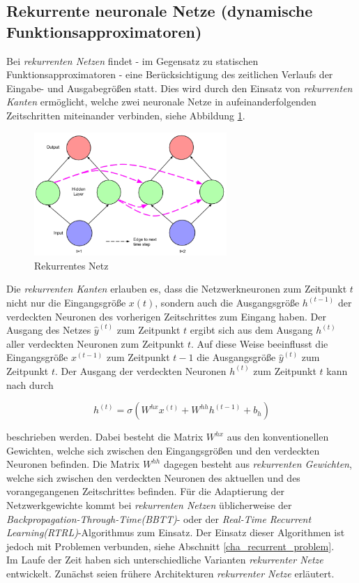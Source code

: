 \subsection{Rekurrente neuronale Netze (dynamische Funktionsapproximatoren)}

Bei \textit{rekurrenten Netzen} findet - im Gegensatz zu statischen Funktionsapproximatoren - eine Berücksichtigung des zeitlichen Verlaufs der Eingabe- und Ausgabegrößen statt. Dies wird durch den Einsatz von \textit{rekurrenten Kanten} ermöglicht, welche zwei neuronale Netze in aufeinanderfolgenden Zeitschritten miteinander verbinden, siehe Abbildung \ref{fig:recurrent}.  

\begin{figure} [h]
	\centering
	\includegraphics[width=0.65\textwidth]{images/recurrent_net}
	\caption{Rekurrentes Netz \cite{Lipton.5292015}}
	\label{fig:recurrent}
\end{figure}

Die \textit{rekurrenten Kanten} erlauben es, dass die Netzwerkneuronen zum Zeitpunkt $t$ nicht nur die Eingangsgröße $x(t)$, sondern auch die Ausgangsgröße $h^{(t-1)}$ der verdeckten Neuronen des vorherigen Zeitschrittes zum Eingang haben. Der Ausgang des Netzes $\hat{y}^{(t)}$ zum Zeitpunkt $t$ ergibt sich aus dem Ausgang $h^{(t)}$ aller verdeckten Neuronen zum Zeitpunkt $t$. Auf diese Weise beeinflusst die Eingangsgröße $x^{(t-1)}$ zum Zeitpunkt $t-1$ die Ausgangsgröße $\hat{y}^{(t)}$ zum Zeitpunkt $t$. Der Ausgang der verdeckten Neuronen $h^{(t)}$ zum Zeitpunkt $t$ kann nach \cite{Lipton.5292015} durch 

\begin{equation}
h^{(t)} = \sigma(W^{hx}x^{(t)} + W^{hh}h^{(t-1)} + b_h)
\end{equation}

beschrieben werden. Dabei besteht die Matrix $W^{hx}$ aus den konventionellen Gewichten, welche sich zwischen den Eingangsgrößen und den verdeckten Neuronen befinden. Die Matrix $W^{hh}$ dagegen besteht aus \textit{rekurrenten Gewichten}, welche sich zwischen den verdeckten Neuronen des aktuellen und des vorangegangenen Zeitschrittes befinden. Für die Adaptierung der Netzwerkgewichte kommt bei \textit{rekurrenten Netzen} üblicherweise der \textit{Backpropagation-Through-Time(BBTT)}- oder der \textit{Real-Time Recurrent Learning(RTRL)}-Algorithmus zum Einsatz. Der Einsatz dieser Algorithmen ist jedoch mit Problemen verbunden, siehe Abschnitt \ref{cha_recurrent_problem}. \\ 
Im Laufe der Zeit haben sich unterschiedliche Varianten \textit{rekurrenter Netze} entwickelt. Zunächst seien frühere Architekturen \textit{rekurrenter Netze} erläutert.


